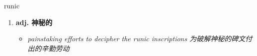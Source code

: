 
\begin{frame}
{\huge runic}
\begin{center}
\begin{enumerate}\Large
  \item \textbf{adj. 神秘的}
  \begin{itemize}
    \item \em{\Large{painstaking efforts to decipher the runic inscriptions 为破解神秘的碑文付出的辛勤劳动}}
  \end{itemize}
\end{enumerate}
\end{center}
\end{frame}
